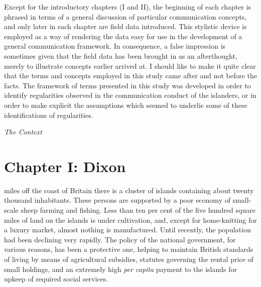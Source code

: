 \documentclass[openany,nobib]{tufte-book}
\let\oldchapter\chapter
\def\chapter{%
  \setcounter{footnote}{0}%
  \oldchapter
}
\begin{document}
Except for the introductory chapters (I and II), the beginning of each
chapter is phrased in terms of a general discussion of particular
communication concepts, and only later in each chapter are field data
introduced. This stylistic device is employed as a way of rendering the
data easy for use in the development of a general communication
framework. In consequence, a false impression is sometimes given that
the field data has been brought in as an afterthought, merely to
illustrate concepts earlier arrived at. I should like to make it quite
clear that the terms and concepts employed in this study came after and
not before the facts. The framework of terms presented in this study was
developed in order to identify regularities observed in the
communication conduct of the islanders, or in order to make explicit the
assumptions which seemed to underlie some of these identifications of
regularities.


\newpage
\thispagestyle{empty}
\begin{fullwidth}

\begin{center}
\vspace*{3in}

{\fontsize{35}{24}\selectfont{Part One}\par}

\vspace{1in}

{\fontsize{35}{24}\selectfont\textit{The Context}\par}

\end{center}

\end{fullwidth}


\chapter[CHAPTER I: DIXON]{Chapter I: Dixon}
\label{ch:Chapter I: Dixon}

miles off the coast of Britain there is a cluster of
islands containing about twenty thousand inhabitants. These persons are
supported by a poor economy of small-scale sheep farming and fishing.
Less than ten per cent of the five hundred square miles of land on the
islands is under cultivation, and, except for home-knitting for a luxury
market, almost nothing is manufactured. Until recently, the population
had been declining very rapidly. The policy of the national government,
for various reasons, has been a protective one, helping to maintain
British standards of living by means of agricultural subsidies, statutes
governing the rental price of small holdings, and an extremely high
\emph{per capita} payment to the islands for upkeep of required social
services.
\end{document}
